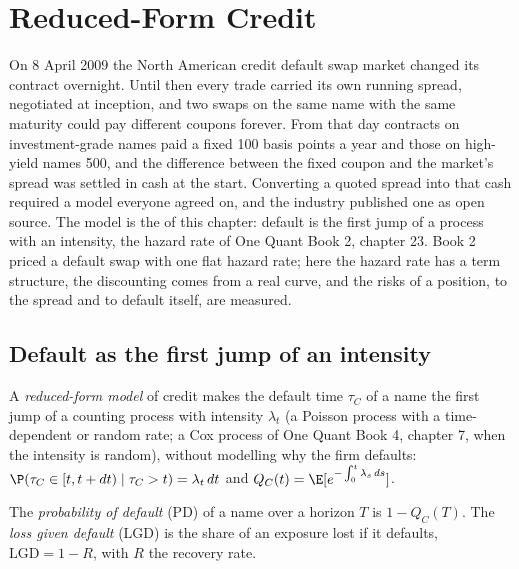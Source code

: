 \chapter{Reduced-Form Credit}\label{ch:rc:reduced-form-credit}

On 8 April 2009 the North American credit default swap market changed its contract
overnight. Until then every trade carried its own running spread, negotiated at
inception, and two swaps on the same name with the same maturity could pay different
coupons forever. From that day contracts on investment-grade names paid a fixed 100
basis points a year and those on high-yield names 500, and the difference between the
fixed coupon and the market's spread was settled in cash at the start. Converting a
quoted spread into that cash required a model everyone agreed on, and the industry
published one as open source. The model is the  of this chapter:
default is the first jump of a process with an intensity, the hazard rate of One
Quant Book 2, chapter 23. Book 2 priced a default swap with one flat hazard rate; here
the hazard rate has a term structure, the discounting comes from a real curve, and the
risks of a position, to the spread and to default itself, are measured.

\section{Default as the first jump of an intensity}

\begin{definition}\label{def:rc:reduced-form-credit:reduced}
A \emph{reduced-form model} of credit makes the default time
$\tau_C$ of a name the first jump of a counting process with intensity $\lambda_t$ (a
Poisson process with a time-dependent or random rate; a Cox process of One Quant Book
4, chapter 7, when the intensity is random), without modelling why the firm defaults:
$\P(\tau_C\in[t,t+dt)\mid\tau_C>t) = \lambda_t\,dt$ and $Q_C(t) = \E[e^{-\int_0^t\lambda_s\,ds}]$.
\end{definition}

\begin{definition}\label{def:rc:reduced-form-credit:pd}
The \emph{probability of default} (PD) of a name over a
horizon $T$ is $1-Q_C(T)$. The \emph{loss given default}
(LGD) is the share of an exposure lost if it defaults, $\mathrm{LGD} = 1-R$, with $R$ the
recovery rate.
\end{definition}

